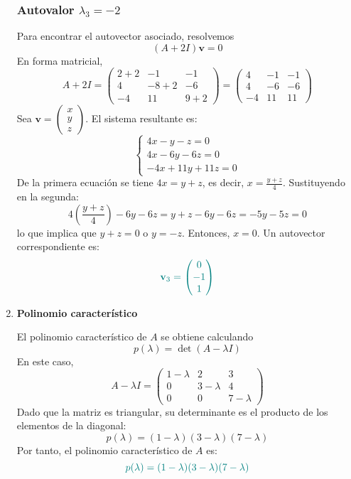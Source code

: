 \documentclass{article}
\begin{document}
\begin{enumerate}[label=\textbf{\alph*)}]
\subsubsection*{Autovalor \( \lambda_3 = -2 \)}
Para encontrar el autovector asociado, resolvemos
\[
(A + 2I)\mathbf{v} = 0
\]
En forma matricial,
\[
A + 2I =
\begin{pmatrix}
2+2 & -1 & -1 \\
4 & -8+2 & -6 \\
-4 & 11 & 9+2
\end{pmatrix}
=
\begin{pmatrix}
4 & -1 & -1 \\
4 & -6 & -6 \\
-4 & 11 & 11
\end{pmatrix}
\]
Sea \( \mathbf{v} = \begin{pmatrix} x \\ y \\ z \end{pmatrix} \). El sistema resultante es:
\[
\begin{cases}
4x - y - z = 0 \\
4x - 6y - 6z = 0 \\
-4x + 11y + 11z = 0
\end{cases}
\]
De la primera ecuación se tiene \( 4x = y+z \), es decir, \( x = \frac{y+z}{4} \). Sustituyendo en la segunda:
\[
4\left(\frac{y+z}{4}\right) - 6y - 6z = y+z - 6y - 6z = -5y - 5z = 0
\]
lo que implica que \( y + z = 0 \) o \( y = -z \). Entonces, \( x = 0 \). Un autovector correspondiente es:
\[\color{teal}
\mathbf{v}_3 = \begin{pmatrix} 0 \\ -1 \\ 1 \end{pmatrix}
\]

 \item \textbf{Polinomio característico}

El polinomio característico de \( A \) se obtiene calculando
\[
p(\lambda) = \det(A - \lambda I)
\]
En este caso,
\[
A - \lambda I =
\begin{pmatrix}
1 - \lambda & 2 & 3 \\
0 & 3 - \lambda & 4 \\
0 & 0 & 7 - \lambda
\end{pmatrix}
\]
Dado que la matriz es triangular, su determinante es el producto de los elementos de la diagonal:
\[
p(\lambda) = (1 - \lambda)(3 - \lambda)(7 - \lambda)
\]
Por tanto, el polinomio característico de \( A \) es:
\[\color{teal}
p(\lambda) = (1 - \lambda)(3 - \lambda)(7 - \lambda)
\]


\end{enumerate}
\end{document}
